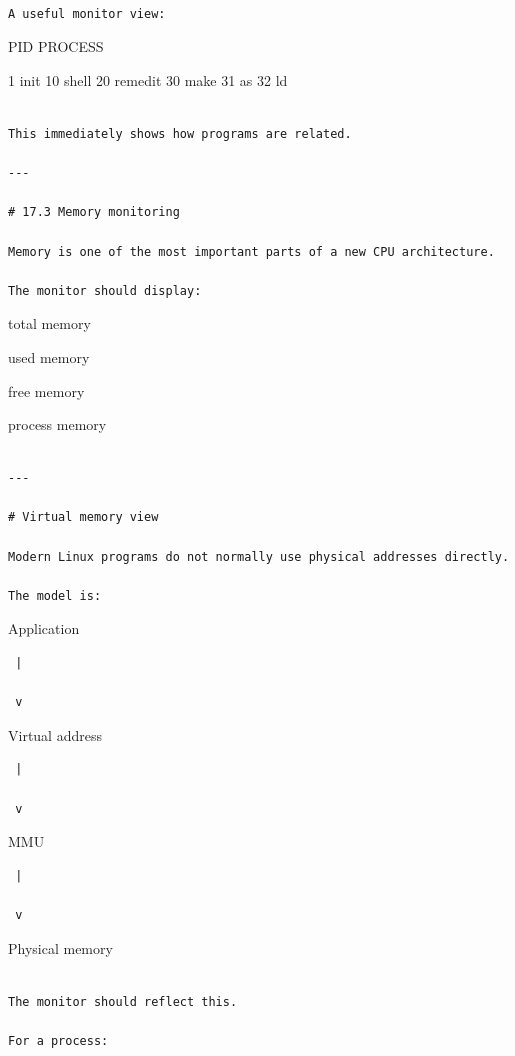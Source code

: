 \documentclass[
  oneside,
  openany]{book}
\begin{document}
\begin{verbatim}

A useful monitor view:
\end{verbatim}

PID PROCESS

1 init 10 shell 20 remedit 30 make 31 as 32 ld

\begin{verbatim}

This immediately shows how programs are related.

---

# 17.3 Memory monitoring

Memory is one of the most important parts of a new CPU architecture.

The monitor should display:
\end{verbatim}

total memory

used memory

free memory

process memory

\begin{verbatim}

---

# Virtual memory view

Modern Linux programs do not normally use physical addresses directly.

The model is:
\end{verbatim}

Application

\begin{verbatim}
 |

 v
\end{verbatim}

Virtual address

\begin{verbatim}
 |

 v
\end{verbatim}

MMU

\begin{verbatim}
 |

 v
\end{verbatim}

Physical memory

\begin{verbatim}

The monitor should reflect this.

For a process:
\end{verbatim}
\end{document}
